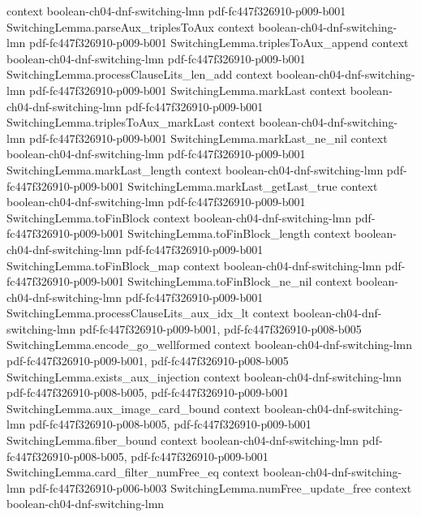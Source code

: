 \begin{theorem}
  {context}
  {boolean-ch04-dnf-switching-lmn}
  {pdf-fc447f326910-p009-b001}
\proofstep
  {SwitchingLemma.parseAux_triplesToAux}
  {context}
  {boolean-ch04-dnf-switching-lmn}
  {pdf-fc447f326910-p009-b001}
\proofstep
  {SwitchingLemma.triplesToAux_append}
  {context}
  {boolean-ch04-dnf-switching-lmn}
  {pdf-fc447f326910-p009-b001}
\proofstep
  {SwitchingLemma.processClauseLits_len_add}
  {context}
  {boolean-ch04-dnf-switching-lmn}
  {pdf-fc447f326910-p009-b001}
\proofstep
  {SwitchingLemma.markLast}
  {context}
  {boolean-ch04-dnf-switching-lmn}
  {pdf-fc447f326910-p009-b001}
\proofstep
  {SwitchingLemma.triplesToAux_markLast}
  {context}
  {boolean-ch04-dnf-switching-lmn}
  {pdf-fc447f326910-p009-b001}
\proofstep
  {SwitchingLemma.markLast_ne_nil}
  {context}
  {boolean-ch04-dnf-switching-lmn}
  {pdf-fc447f326910-p009-b001}
\proofstep
  {SwitchingLemma.markLast_length}
  {context}
  {boolean-ch04-dnf-switching-lmn}
  {pdf-fc447f326910-p009-b001}
\proofstep
  {SwitchingLemma.markLast_getLast_true}
  {context}
  {boolean-ch04-dnf-switching-lmn}
  {pdf-fc447f326910-p009-b001}
\proofstep
  {SwitchingLemma.toFinBlock}
  {context}
  {boolean-ch04-dnf-switching-lmn}
  {pdf-fc447f326910-p009-b001}
\proofstep
  {SwitchingLemma.toFinBlock_length}
  {context}
  {boolean-ch04-dnf-switching-lmn}
  {pdf-fc447f326910-p009-b001}
\proofstep
  {SwitchingLemma.toFinBlock_map}
  {context}
  {boolean-ch04-dnf-switching-lmn}
  {pdf-fc447f326910-p009-b001}
\proofstep
  {SwitchingLemma.toFinBlock_ne_nil}
  {context}
  {boolean-ch04-dnf-switching-lmn}
  {pdf-fc447f326910-p009-b001}
\proofstep
  {SwitchingLemma.processClauseLits_aux_idx_lt}
  {context}
  {boolean-ch04-dnf-switching-lmn}
  {pdf-fc447f326910-p009-b001,
    pdf-fc447f326910-p008-b005}
\proofstep
  {SwitchingLemma.encode_go_wellformed}
  {context}
  {boolean-ch04-dnf-switching-lmn}
  {pdf-fc447f326910-p009-b001,
    pdf-fc447f326910-p008-b005}
\proofstep
  {SwitchingLemma.exists_aux_injection}
  {context}
  {boolean-ch04-dnf-switching-lmn}
  {pdf-fc447f326910-p008-b005,
    pdf-fc447f326910-p009-b001}
\proofstep
  {SwitchingLemma.aux_image_card_bound}
  {context}
  {boolean-ch04-dnf-switching-lmn}
  {pdf-fc447f326910-p008-b005,
    pdf-fc447f326910-p009-b001}
\proofstep
  {SwitchingLemma.fiber_bound}
  {context}
  {boolean-ch04-dnf-switching-lmn}
  {pdf-fc447f326910-p008-b005,
    pdf-fc447f326910-p009-b001}
\proofstep
  {SwitchingLemma.card_filter_numFree_eq}
  {context}
  {boolean-ch04-dnf-switching-lmn}
  {pdf-fc447f326910-p006-b003}
\proofstep
  {SwitchingLemma.numFree_update_free}
  {context}
  {boolean-ch04-dnf-switching-lmn}

\end{theorem}
